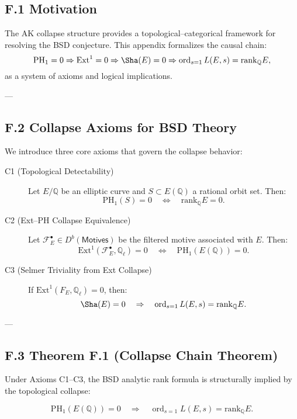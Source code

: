 \subsection*{F.1 Motivation}

The AK collapse structure provides a topological–categorical framework for resolving the BSD conjecture.  
This appendix formalizes the causal chain:
\[
\mathrm{PH}_1 = 0 \Rightarrow \mathrm{Ext}^1 = 0 \Rightarrow \Sha(E) = 0 \Rightarrow \operatorname{ord}_{s=1}L(E,s) = \mathrm{rank}_{\mathbb{Q}}E,
\]
as a system of axioms and logical implications.

---

\subsection*{F.2 Collapse Axioms for BSD Theory}

We introduce three core axioms that govern the collapse behavior:

\begin{description}
  \item[C1 (Topological Detectability)]  
  Let \( E/\mathbb{Q} \) be an elliptic curve and \( S \subset E(\mathbb{Q}) \) a rational orbit set.  
  Then:
  \[
  \mathrm{PH}_1(S) = 0 \quad \Leftrightarrow \quad \mathrm{rank}_{\mathbb{Q}}E = 0.
  \]

  \item[C2 (Ext–PH Collapse Equivalence)]  
  Let \( \mathcal{F}_E^\bullet \in D^b(\mathsf{Motives}) \) be the filtered motive associated with \( E \).  
  Then:
  \[
  \mathrm{Ext}^1(\mathcal{F}_E^\bullet, \mathbb{Q}_\ell) = 0 \quad \Leftrightarrow \quad \mathrm{PH}_1(E(\mathbb{Q})) = 0.
  \]

  \item[C3 (Selmer Triviality from Ext Collapse)]  
  If \( \mathrm{Ext}^1(F_E, \mathbb{Q}_\ell) = 0 \), then:
  \[
  \Sha(E) = 0 \quad \Rightarrow \quad \operatorname{ord}_{s=1}L(E,s) = \mathrm{rank}_{\mathbb{Q}}E.
  \]
\end{description}

---

\subsection*{F.3 Theorem F.1 (Collapse Chain Theorem)}

\begin{theorem}
Under Axioms C1–C3, the BSD analytic rank formula is structurally implied by the topological collapse:

\[
\mathrm{PH}_1(E(\mathbb{Q})) = 0 \quad \Rightarrow \quad \operatorname{ord}_{s=1}L(E,s) = \mathrm{rank}_{\mathbb{Q}}E.
\]
\end{theorem}

